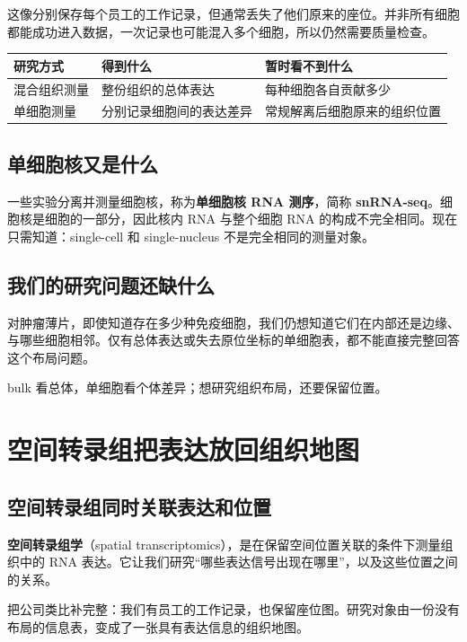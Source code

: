 \documentclass[UTF8,a4paper,11pt,fontset=fandol]{ctexart}
\newcommand{\term}[2]{{\color{accent}\textbf{#1}}（#2）}
\newcommand{\takeaway}[1]{\begin{tcolorbox}[learningstyle,title=本章要记住]#1\end{tcolorbox}}
\newcommand{\chapterstart}[1]{\clearpage\section{#1}}
\begin{document}
这像分别保存每个员工的工作记录，但通常丢失了他们原来的座位。并非所有细胞都能成功进入数据，一次记录也可能混入多个细胞，所以仍然需要质量检查。

\begin{center}
\begin{tabularx}{\linewidth}{@{}l Y Y@{}}
\toprule
{}
研究方式 & 得到什么 & 暂时看不到什么 \\
\midrule
混合组织测量 & 整份组织的总体表达 & 每种细胞各自贡献多少 \\
单细胞测量 & 分别记录细胞间的表达差异 & 常规解离后细胞原来的组织位置 \\
\bottomrule
\end{tabularx}
\end{center}

\subsection{单细胞核又是什么}
一些实验分离并测量细胞核，称为\textbf{单细胞核 RNA 测序}，简称 \textbf{snRNA-seq}。细胞核是细胞的一部分，因此核内 RNA 与整个细胞 RNA 的构成不完全相同。现在只需知道：single-cell 和 single-nucleus 不是完全相同的测量对象。

\subsection{我们的研究问题还缺什么}
对肿瘤薄片，即使知道存在多少种免疫细胞，我们仍想知道它们在内部还是边缘、与哪些细胞相邻。仅有总体表达或失去原位坐标的单细胞表，都不能直接完整回答这个布局问题。

\takeaway{bulk 看总体，单细胞看个体差异；想研究组织布局，还要保留位置。}

\chapterstart{空间转录组把表达放回组织地图}
\subsection{空间转录组同时关联表达和位置}
\term{空间转录组学}{spatial transcriptomics}，是在保留空间位置关联的条件下测量组织中的 RNA 表达。它让我们研究“哪些表达信号出现在哪里”，以及这些位置之间的关系。\cite{stahl2016}

把公司类比补完整：我们有员工的工作记录，也保留座位图。研究对象由一份没有布局的信息表，变成了一张具有表达信息的组织地图。
\end{document}
